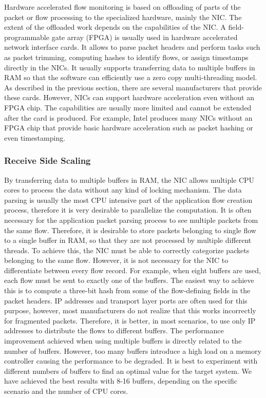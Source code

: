 Hardware accelerated flow monitoring is based on offloading of parts of the packet or flow processing to the specialized hardware, mainly the NIC. The extent of the offloaded work depends on the capabilities of the NIC. A field-programmable gate array (FPGA) is usually used in hardware accelerated network interface cards. It allows to parse packet headers and perform tasks such as packet trimming, computing hashes to identify flows, or assign timestamps directly in the NICs. It usually supports transferring data to multiple buffers in RAM so that the software can efficiently use a zero copy multi-threading model. As described in the previous section, there are several manufacturers that provide these cards. However, NICs can support hardware acceleration even without an FPGA chip. The capabilities are usually more limited and cannot be extended after the card is produced. For example, Intel produces many NICs without an FPGA chip that provide basic hardware acceleration such as packet hashing or even timestamping.

\subsubsection{Receive Side Scaling}

By transferring data to multiple buffers in RAM, the NIC allows multiple CPU cores to process the data without any kind of locking mechanism. The data parsing is usually the most CPU intensive part of the application flow creation process, therefore it is very desirable to parallelize the computation. It is often necessary for the application packet parsing process to see multiple packets from the same flow. Therefore, it is desirable to store packets belonging to single flow to a single buffer in RAM, so that they are not processed by multiple different threads. To achieve this, the NIC must be able to correctly categorize packets belonging to the same flow. However, it is not necessary for the NIC to differentiate between every flow record. For example, when eight buffers are used, each flow must be sent to exactly one of the buffers. The easiest way to achieve this is to compute a three-bit hash from some of the flow-defining fields in the packet headers. IP addresses and transport layer ports are often used for this purpose, however, most manufacturers do not realize that this works incorrectly for fragmented packets. Therefore, it is better, in most scenarios, to use only IP addresses to distribute the flows to different buffers. The performance improvement achieved when using multiple buffers is directly related to the number of buffers. However, too many buffers introduce a high load on a memory controller causing the performance to be degraded. It is best to experiment with different numbers of buffers to find an optimal value for the target system. We have achieved the best results with 8-16 buffers, depending on the specific scenario and the number of CPU cores.

